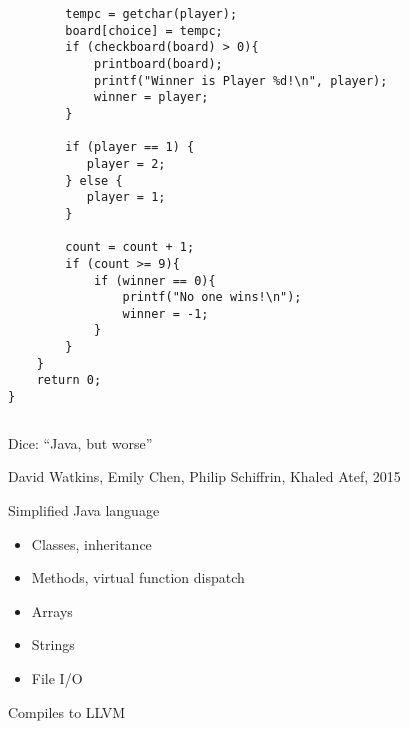 \documentclass{plt}
\begin{document}
\begin{frame}[fragile]
\begin{columns}
\begin{column}{0.5\textwidth}
\fontsize{7pt}{7pt}\selectfont
\begin{verbatim}
        tempc = getchar(player);
        board[choice] = tempc;
        if (checkboard(board) > 0){
            printboard(board);
            printf("Winner is Player %d!\n", player);
            winner = player;
        }

        if (player == 1) {
           player = 2;
        } else {
           player = 1;
        }

        count = count + 1;
        if (count >= 9){
            if (winner == 0){
                printf("No one wins!\n");
                winner = -1;
            }
        }
    }
    return 0;
}
\end{verbatim}
\end{column}
\end{columns}
\end{frame}

\begin{frame}{Dice: ``Java, but worse''}

{\small David Watkins, Emily Chen, Philip Schiffrin, Khaled Atef, 2015}

Simplified Java language

\begin{itemize}
\item Classes, inheritance
\item Methods, virtual function dispatch
\item Arrays
\item Strings
\item File I/O
\end{itemize}

Compiles to LLVM

\end{frame}
\end{document}
